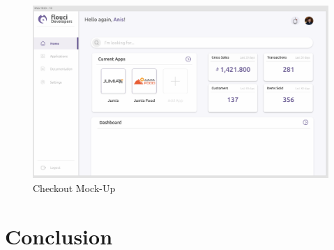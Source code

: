 \begin{spacing}{1.2}
\begin{figure}[!h]\centering
\includegraphics[scale=0.4]{web_screen}
\caption{Checkout Mock-Up}
\label{fig:fig1}
\end{figure}

\section*{Conclusion}

\end{spacing}
